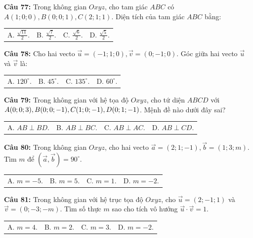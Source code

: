 \documentclass[12pt]{article}
\begin{document}
	\vspace{2mm}
	\noindent \textbf{Câu 77:} Trong không gian $Oxyz$, cho tam giác $ABC$ có $A(1; 0; 0), B(0; 0; 1), C(2; 1; 1)$. Diện tích của tam giác $ABC$ bằng: \\
	\noindent
	\begin{tabular}{p{} p{} p{} p{}}
		A. $\frac{\sqrt{11}}{2}$. & B. $\frac{\sqrt{7}}{2}$. & C. $\frac{\sqrt{6}}{2}$. & D. $\frac{\sqrt{5}}{2}$.
	\end{tabular}
	
	\vspace{2mm}
	\noindent \textbf{Câu 78:} Cho hai vecto $\vec{u} = (-1; 1; 0), \vec{v} = (0; -1; 0)$. Góc giữa hai vecto $\vec{u}$ và $\vec{v}$ là: \\
	\noindent
	\begin{tabular}{p{} p{} p{} p{}}
		A. $120^\circ$. & B. $45^\circ$. & C. $135^\circ$. & D. $60^\circ$.
	\end{tabular}
	
	\vspace{2mm}
	\noindent \textbf{Câu 79:} Trong không gian với hệ tọa độ $Oxyz$, cho tứ diện $ABCD$ với $A(0; 0; 3), B(0; 0; -1), \\C(1; 0; -1), D(0; 1; -1)$. Mệnh đề nào dưới đây sai? \\
	\noindent
	\begin{tabular}{p{} p{} p{} p{}}
		A. $AB \perp BD$. & B. $AB \perp BC$. & C. $AB \perp AC$. & D. $AB \perp CD$.
	\end{tabular}
	
	\vspace{2mm}
	\noindent \textbf{Câu 80:} Trong không gian $Oxyz$, cho hai vecto $\vec{a} = (2; 1; -1), \vec{b} = (1; 3; m)$. Tìm $m$ để $(\vec{a}, \vec{b}) = 90^\circ$. \\
	\noindent
	\begin{tabular}{p{} p{} p{} p{}}
		A. $m = -5$. & B. $m = 5$. & C. $m = 1$. & D. $m = -2$.
	\end{tabular}
	
	\vspace{2mm}
	\noindent \textbf{Câu 81:} Trong không gian với hệ trục tọa độ $Oxyz$, cho $\vec{u} = (2; -1; 1)$ và $\vec{v} = (0; -3; -m)$. Tìm số thực $m$ sao cho tích vô hướng $\vec{u} \cdot \vec{v} = 1$. \\
	\noindent
	\begin{tabular}{p{} p{} p{} p{}}
		A. $m = 4$. & B. $m = 2$. & C. $m = 3$. & D. $m = -2$.
	\end{tabular}
	
\end{document}
